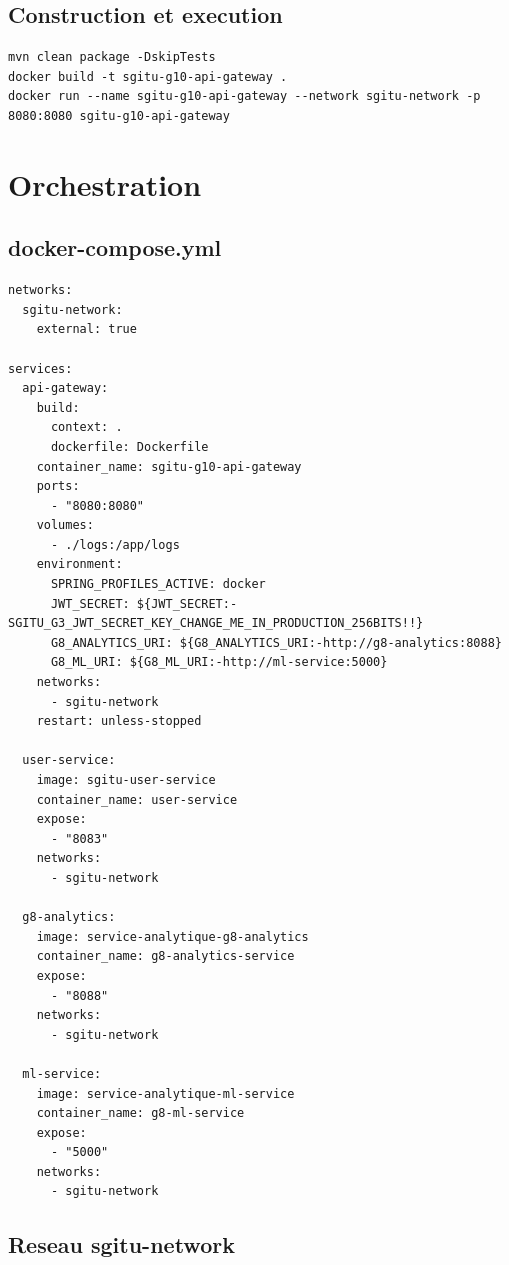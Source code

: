 \documentclass[12pt, a4paper]{article}
\begin{document}
\subsection{Construction et execution}

\begin{lstlisting}[style=codeStyle]
mvn clean package -DskipTests
docker build -t sgitu-g10-api-gateway .
docker run --name sgitu-g10-api-gateway --network sgitu-network -p 8080:8080 sgitu-g10-api-gateway
\end{lstlisting}

\section{Orchestration}

\subsection{docker-compose.yml}

\begin{lstlisting}[style=codeStyle]
networks:
  sgitu-network:
    external: true

services:
  api-gateway:
    build:
      context: .
      dockerfile: Dockerfile
    container_name: sgitu-g10-api-gateway
    ports:
      - "8080:8080"
    volumes:
      - ./logs:/app/logs
    environment:
      SPRING_PROFILES_ACTIVE: docker
      JWT_SECRET: ${JWT_SECRET:-SGITU_G3_JWT_SECRET_KEY_CHANGE_ME_IN_PRODUCTION_256BITS!!}
      G8_ANALYTICS_URI: ${G8_ANALYTICS_URI:-http://g8-analytics:8088}
      G8_ML_URI: ${G8_ML_URI:-http://ml-service:5000}
    networks:
      - sgitu-network
    restart: unless-stopped

  user-service:
    image: sgitu-user-service
    container_name: user-service
    expose:
      - "8083"
    networks:
      - sgitu-network

  g8-analytics:
    image: service-analytique-g8-analytics
    container_name: g8-analytics-service
    expose:
      - "8088"
    networks:
      - sgitu-network

  ml-service:
    image: service-analytique-ml-service
    container_name: g8-ml-service
    expose:
      - "5000"
    networks:
      - sgitu-network
\end{lstlisting}

\subsection{Reseau sgitu-network}
\end{document}
